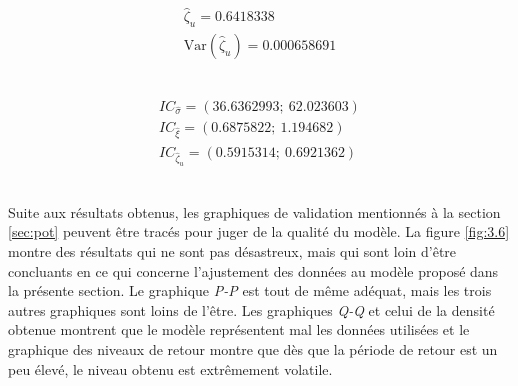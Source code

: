 \begin{equation*}
\begin{gathered}
\hat\zeta_u = 0.6418338\\
\text{Var}(\hat\zeta_u) = 0.000658691
\end{gathered}
\end{equation*}
\

\begin{equation*}
\begin{gathered}
IC_{\hat\sigma} = (36.6362993;\ 62.023603)\\
IC_{\hat\xi} = (0.6875822;\ 1.194682)\\
IC_{\hat\zeta_u} = (0.5915314;\ 0.6921362)
\end{gathered}
\end{equation*}
\

Suite aux résultats obtenus, les graphiques de validation mentionnés à la section \ref{sec:pot} peuvent être tracés pour juger de la qualité du modèle. La figure \ref{fig:3.6} montre des résultats qui ne sont pas désastreux, mais qui sont loin d'être concluants en ce qui concerne l'ajustement des données au modèle proposé dans la présente section. Le graphique \textit{P-P} est tout de même adéquat, mais les trois autres graphiques sont loins de l'être. Les graphiques \textit{Q-Q} et celui de la densité obtenue montrent que le modèle représentent mal les données utilisées et le graphique des niveaux de retour montre que dès que la période de retour est un peu élevé, le niveau obtenu est extrêmement volatile. 
\


